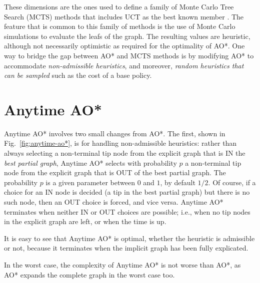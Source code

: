 \documentclass[letterpaper]{article}
\newcommand{\Omit}[1]{}
\begin{document}
%
These dimensions are %
the ones used to define  a  family of
Monte Carlo Tree Search (MCTS) methods that includes  UCT as the
best known member \cite{mcts}. The feature that is common to this family of
methods is the use of Monte Carlo simulations to evaluate the leafs of the
graph.  The resulting values are heuristic, although not necessarily optimistic
as required for the optimality of AO*.  One  way to bridge the gap between AO* and MCTS methods
is by modifying AO* to accommodate \emph{non-admissible heuristics},
and moreover, \emph{random heuristics that can be sampled} such as
the cost of a base policy.
%
\Omit{
Indeed, when the heuristic of a node $(s,d)$ is set to the reward
obtained by running a base policy for $d$ steps,
the \emph{heuristic} is being set to a random variable, whose
samples are not necessarily admissible (even if  the base policy is optimal).
 \footnote{**** CHECK: Left:
tree vs.\ graph in various methods.***}
}

\section{Anytime AO*}

\Omit{Anytime AO* is a simple variation of AO* aimed at
anytime optimality even in the presence of random
and non-admissible heuristics. By random heuristic, we mean
a heuristic that corresponds to a random variable that can be sampled,
such as the cost of a base policy.}

Anytime AO* involves two small changes from AO*.
The first, shown in Fig.~\ref{fig:anytime-ao*}, is for handling non-admissible heuristics:
rather than always selecting a non-terminal tip node from the
explicit graph that is IN the \emph{best partial graph}, Anytime
AO* selects with probability $p$ a non-terminal tip node from the
explicit graph that is OUT of the best partial graph. The probability
$p$ is a given parameter between $0$ and $1$, by default $1/2$.
Of course, if a choice for an IN node is decided (a tip in the best
partial graph)  but there is no such node, then an OUT choice is
forced, and vice versa. Anytime AO* terminates when neither IN or OUT choices
are possible; i.e., when no tip nodes in the explicit graph are left,
or when the time is up.

It is easy to see that Anytime AO* is optimal, whether the
heuristic is admissible or not, because it terminates when
the implicit %
graph has been fully explicated.
%
\Omit{
with the
same terminal nodes and values. The Bellman updates ensure that
the rest of the nodes get their correct (optimal) values.
}
%
In the worst case, the complexity of Anytime AO* is not worse
than AO*, as AO* expands the complete graph in the worst case
too.
\end{document}
